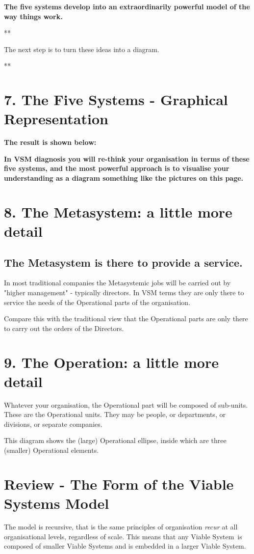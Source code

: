 \textbf{The five systems develop into an extraordinarily powerful model of the way things work.}

**

The next step is to turn these ideas into a diagram.

**

\section*{7. The Five Systems - Graphical Representation}
\textbf{The result is shown below:}

\textbf{In VSM diagnosis you will re-think your organisation in terms of these five systems, and the most powerful approach is to visualise your understanding as a diagram something like the pictures on this page.}

\section*{8. The \textcolor{M}{\textbf{Metasystem}}: a little more detail}

\subsection*{The \textcolor{M}{\textbf{Metasystem}} is there to provide a service.}
In most traditional companies the Metasystemic jobs will be carried out by "higher management" - typically directors. In VSM terms they are only there to service the needs of the Operational parts of the organisation.

Compare this with the traditional view that the Operational parts are only there to carry out the orders of the Directors.

\section*{9. The \textcolor{O}{\textbf{Operation}}: a little more detail}
Whatever your organisation, the Operational part will be composed of sub-units. These are the Operational units. They may be people, or departments, or divisions, or separate companies.

This diagram shows the (large) Operational ellipse, inside which are three (smaller) Operational elements.


\section*{Review - The Form of the Viable Systems Model}
The model is recursive, that is the same principles of organisation \textit{recur} at all organisational levels, regardless of scale. This means that any Viable System is composed of smaller Viable Systems and is embedded in a larger Viable System.
